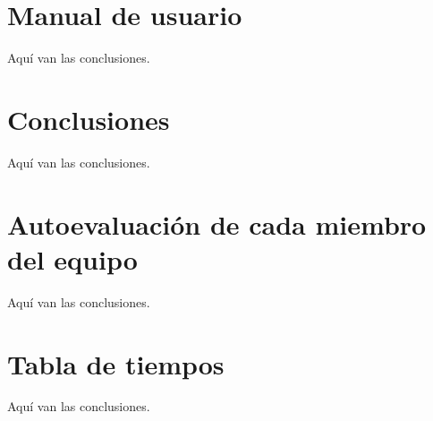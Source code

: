 \documentclass[12pt]{article} %
\begin{document}


\section{Manual de usuario}
Aquí van las conclusiones.

\section{Conclusiones}
Aquí van las conclusiones.

\section{Autoevaluación de cada miembro del equipo}
Aquí van las conclusiones.

\section{Tabla de tiempos}
Aquí van las conclusiones.

\printbibliography
\end{document}
